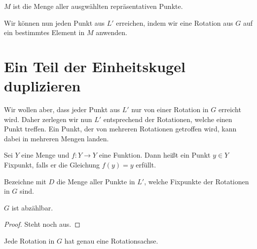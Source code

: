 \begin{definition} \label{def:menge_rep_punkte} 
$M$ ist die Menge aller ausgwählten repräsentativen Punkte.
 \leanok
\end{definition} 

Wir können nun jeden Punkt aus $L'$ erreichen, indem wir eine Rotation aus $G$ auf ein bestimmtes Element in $M$ anwenden.

\section{Ein Teil der Einheitskugel duplizieren}

Wir wollen aber, dass jeder Punkt aus $L'$ nur von einer Rotation in $G$ erreicht wird. Daher zerlegen wir nun $L'$ entsprechend
der Rotationen, welche einen Punkt treffen. Ein Punkt, der von mehreren Rotationen getroffen wird, kann dabei in mehreren Mengen landen.


\begin{definition}[Fixpunkte] \label{def:fixpunkte}
Sei $Y$ eine Menge und $f:Y\rightarrow Y$ eine Funktion. Dann heißt ein Punkt $y\in Y$ Fixpunkt, falls er die Gleichung $f(y)=y$
erfüllt.
\leanok {}
\end{definition}

\begin{definition} \label{def:menge_fixpunkte} 
Bezeichne mit $D$ die Menge aller Punkte in $L'$, welche Fixpunkte der Rotationen in $G$ sind.
\leanok {}
\end{definition}

\begin{lemma} \label{lemma:G_abzaehlbar}
$G$ ist abzählbar.
 \leanok
\end{lemma}
\begin{proof} 
Steht noch aus.
\end{proof}

\begin{definition} \label{lemma:eine_rot_achse}
Jede Rotation in $G$ hat genau eine Rotationsachse.
 \leanok {}
\end{definition}


